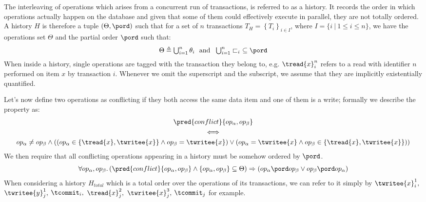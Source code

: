 The interleaving of operations which arises from a concurrent run of transactions, is referred to as a history. It records the order in which operations actually happen on the database and given that some of them could effectively execute in parallel, they are not totally ordered. A history $H$ \cite{ccontrol} is therefore a tuple $(\Theta, \pord)$ such that for a set of $n$ transactions $T_H = \left\lbrace T_i \right\rbrace_{i \in I}$, where $I = \{ i\ |\ 1 \leq i \leq n\}$, we have the operations set $\Theta$ and the partial order $\pord$ such that:
\[
	\begin{array}{c}
		\Theta \triangleq \bigcup_{i = 1}^{n} \theta_i\
		\text{ and }\
		\bigcup_{i = 1}^{n} \sqsubset_i\ \subseteq \pord
	\end{array}
\]
When inside a history, single operations are tagged with the transaction they belong to, e.g. $\tread{x}^n_i$ refers to a read with identifier $n$ performed on item $x$ by transaction $i$. Whenever we omit the superscript and the subscript, we assume that they are implicitly existentially quantified.

Let's now define two operations as conflicting if they both access the same data item and one of them is a write; formally we describe the property as:
\begin{gather*}
	\pred{conflict}{op_\alpha, op_\beta} \\
	\iff \\
	op_\alpha \neq op_\beta \land \left(\left( op_\alpha \in \{ \tread{x}, \twritee{x} \} \land op_\beta = \twritee{x} \right) \lor \left( op_\alpha = \twritee{x} \land op_\beta \in \{ \tread{x}, \twritee{x} \} \right)\right)
\end{gather*}
We then require that all conflicting operations appearing in a history must be somehow ordered by $\pord$.
\[
	\forall op_\alpha, op_\beta \ldotp (\pred{conflict}{op_\alpha, op_\beta} \land\left\lbrace op_\alpha, op_\beta \right\rbrace \subseteq \Theta) \Rightarrow (op_\alpha \pord op_\beta \lor op_\beta \pord op_\alpha)
\]
When considering a history $H_{total}$ which is a total order over the operations of its transactions, we can refer to it simply by $\twritee{x}_i^1, $ $\twritee{y}_j^1, $ $\tcommit_i, $ $\tread{x}_j^2, $ $\twritee{x}_j^3, $ $\tcommit_j$ for example.


